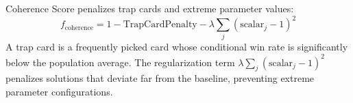 Coherence Score penalizes trap cards and extreme parameter values:
\begin{equation}
f_{\text{coherence}} = 1 - \text{TrapCardPenalty} - \lambda \sum_{j}\left(\text{scalar}_j - 1\right)^2
\label{eq:coherence_score}
\end{equation}
A trap card is a frequently picked card whose conditional win rate is significantly below the population average. The regularization term $\lambda \sum_j (\text{scalar}_j - 1)^2$ penalizes solutions that deviate far from the baseline, preventing extreme parameter configurations.

